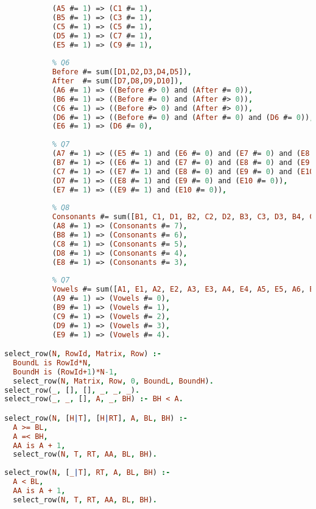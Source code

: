 \begin{lstlisting}[language=PROLOG]
           % Q5
           (A5 #= 1) => (C1 #= 1),
           (B5 #= 1) => (C3 #= 1),
           (C5 #= 1) => (C5 #= 1),
           (D5 #= 1) => (C7 #= 1),
           (E5 #= 1) => (C9 #= 1),
           
           % Q6
           Before #= sum([D1,D2,D3,D4,D5]),
           After  #= sum([D7,D8,D9,D10]),
           (A6 #= 1) => ((Before #> 0) and (After #= 0)),
           (B6 #= 1) => ((Before #= 0) and (After #> 0)),
           (C6 #= 1) => ((Before #> 0) and (After #> 0)),
           (D6 #= 1) => ((Before #= 0) and (After #= 0) and (D6 #= 0)),
           (E6 #= 1) => (D6 #= 0),
           
           % Q7
           (A7 #= 1) => ((E5 #= 1) and (E6 #= 0) and (E7 #= 0) and (E8 #= 0) and (E9 #= 0) and (E10 #= 0)),
           (B7 #= 1) => ((E6 #= 1) and (E7 #= 0) and (E8 #= 0) and (E9 #= 0) and (E10 #= 0)),
           (C7 #= 1) => ((E7 #= 1) and (E8 #= 0) and (E9 #= 0) and (E10 #= 0)),
           (D7 #= 1) => ((E8 #= 1) and (E9 #= 0) and (E10 #= 0)),
           (E7 #= 1) => ((E9 #= 1) and (E10 #= 0)),
           
           % Q8
           Consonants #= sum([B1, C1, D1, B2, C2, D2, B3, C3, D3, B4, C4, D4, B5, C5, D5, B6, C6, D6, B7, C7, D7, B8, C8, D8, B9, C9, D9, B10, C10, D10]),
           (A8 #= 1) => (Consonants #= 7),
           (B8 #= 1) => (Consonants #= 6),
           (C8 #= 1) => (Consonants #= 5),
           (D8 #= 1) => (Consonants #= 4),
           (E8 #= 1) => (Consonants #= 3),
           
           % Q7
           Vowels #= sum([A1, E1, A2, E2, A3, E3, A4, E4, A5, E5, A6, E6, A7, E7, A8, E8, A9, E9, A10, E10]),
           (A9 #= 1) => (Vowels #= 0),
           (B9 #= 1) => (Vowels #= 1),
           (C9 #= 1) => (Vowels #= 2),
           (D9 #= 1) => (Vowels #= 3),
           (E9 #= 1) => (Vowels #= 4).

select_row(N, RowId, Matrix, Row) :-  
  BoundL is RowId*N, 
  BoundH is (RowId+1)*N-1, 
  select_row(N, Matrix, Row, 0, BoundL, BoundH).
select_row(_, [], [], _, _, _).
select_row(_, _, [], A, _, BH) :- BH < A.

select_row(N, [H|T], [H|RT], A, BL, BH) :-
  A >= BL,
  A =< BH,
  AA is A + 1,
  select_row(N, T, RT, AA, BL, BH).
  
select_row(N, [_|T], RT, A, BL, BH) :-
  A < BL,
  AA is A + 1,
  select_row(N, T, RT, AA, BL, BH).
\end{lstlisting}

